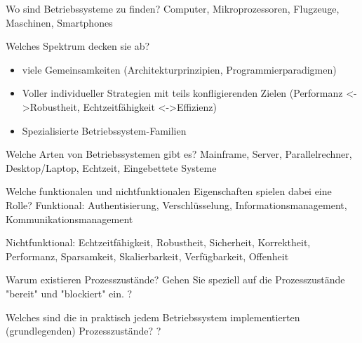 \documentclass[avery5371]{flashcards}
\begin{document}
\begin{flashcard}[Einführung]{Wo sind Betriebssysteme zu finden?}
    Computer, Mikroprozessoren, Flugzeuge, Maschinen, Smartphones
\end{flashcard}

\begin{flashcard}[Einführung]{Welches Spektrum decken sie ab?}
    \begin{itemize}
        \item viele Gemeinsamkeiten (Architekturprinzipien, Programmierparadigmen)
        \item Voller individueller Strategien mit teils konfligierenden Zielen (Performanz <->Robustheit, Echtzeitfähigkeit <->Effizienz)
        \item Spezialisierte Betriebssystem-Familien
    \end{itemize}
\end{flashcard}

\begin{flashcard}[Einführung]{Welche Arten von Betriebssystemen gibt es?}
    Mainframe, Server, Parallelrechner, Desktop/Laptop, Echtzeit, Eingebettete Systeme
\end{flashcard}

\begin{flashcard}[Einführung]{Welche funktionalen und nichtfunktionalen Eigenschaften spielen dabei eine Rolle?}
    Funktional: Authentisierung, Verschlüsselung, Informationsmanagement, Kommunikationsmanagement

    Nichtfunktional: Echtzeitfähigkeit, Robustheit, Sicherheit, Korrektheit, Performanz, Sparsamkeit, Skalierbarkeit, Verfügbarkeit, Offenheit
\end{flashcard}

\begin{flashcard}{Warum existieren Prozesszustände? Gehen Sie speziell auf die Prozesszustände "bereit" und "blockiert" ein.}
    ?
\end{flashcard}

\begin{flashcard}{Welches sind die in praktisch jedem Betriebssystem implementierten (grundlegenden) Prozesszustände?}
    ?
\end{flashcard}
\end{document}
